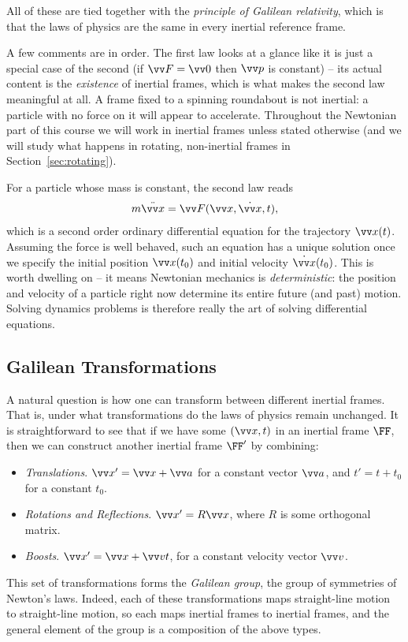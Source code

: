 All of these are tied together with the \emph{principle of Galilean relativity}, which is that the laws of physics are the same in every inertial reference frame.

A few comments are in order. The first law looks at a glance like it is just a special case of the second (if $\vv F = \vv 0$ then $\vv p$ is constant) -- its actual content is the \emph{existence} of inertial frames, which is what makes the second law meaningful at all. A frame fixed to a spinning roundabout is not inertial: a particle with no force on it will appear to accelerate. Throughout the Newtonian part of this course we will work in inertial frames unless stated otherwise (and we will study what happens in rotating, non-inertial frames in Section~\ref{sec:rotating}).

For a particle whose mass is constant, the second law reads
$$
m \ddot{\vv x} = \vv F(\vv x, \dot{\vv x}, t),
$$
which is a second order ordinary differential equation for the trajectory $\vv x(t)$. Assuming the force is well behaved, such an equation has a unique solution once we specify the initial position $\vv x(t_0)$ and initial velocity $\dot{\vv x}(t_0)$. This is worth dwelling on -- it means Newtonian mechanics is \emph{deterministic}: the position and velocity of a particle right now determine its entire future (and past) motion. Solving dynamics problems is therefore really the art of solving differential equations.

\subsection{Galilean Transformations}

A natural question is how one can transform between different inertial frames. That is, under what transformations do the laws of physics remain unchanged. It is straightforward to see that if we have some $(\vv x, t)$ in an inertial frame $\FF$, then we can construct another inertial frame $\FF'$ by combining:
\begin{itemize}
	\item \emph{Translations}. $\vv x' = \vv x + \vv a$ for a constant vector $\vv a$, and $t' = t + t_0$ for a constant $t_0$.
	\item \emph{Rotations and Reflections}. $\vv x' = R \vv x$, where $R$ is some orthogonal matrix.
	\item \emph{Boosts}. $\vv x' = \vv x + \vv v t$, for a constant velocity vector $\vv v$.
\end{itemize}
This set of transformations forms the \emph{Galilean group}, the group of symmetries of Newton's laws. Indeed, each of these transformations maps straight-line motion to straight-line motion, so each maps inertial frames to inertial frames, and the general element of the group is a composition of the above types.

